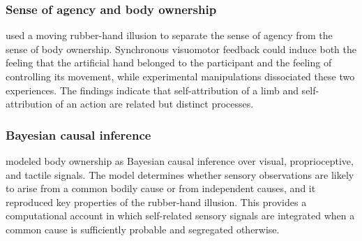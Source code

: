 \documentclass[a4paper]{article}
\begin{document}
         \subsubsection{Sense of agency and body ownership}
            \cite{kalckert-2012-moving-a-rubber-hand-that-feels-like-your-own} used a moving rubber-hand illusion to separate the sense of agency from the sense of body ownership. Synchronous visuomotor feedback could induce both the feeling that the artificial hand belonged to the participant and the feeling of controlling its movement, while experimental manipulations dissociated these two experiences. The findings indicate that self-attribution of a limb and self-attribution of an action are related but distinct processes.

         \subsubsection{Bayesian causal inference}
            \cite{samad-2015-perception-of-body-ownership-is-driven-by-bayesian-sensory-inference} modeled body ownership as Bayesian causal inference over visual, proprioceptive, and tactile signals. The model determines whether sensory observations are likely to arise from a common bodily cause or from independent causes, and it reproduced key properties of the rubber-hand illusion. This provides a computational account in which self-related sensory signals are integrated when a common cause is sufficiently probable and segregated otherwise. 


   
   
\end{document}
